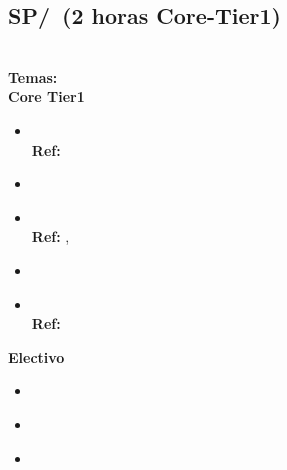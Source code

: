 \subsection{SP/\SPPrivacyandCivilLiberties~(2 horas Core-Tier1)}\label{sec:BOK:SPPrivacyandCivilLiberties}
\SPPrivacyandCivilLibertiesDescription\\
\noindent \textbf{Temas:}\\
\noindent \textbf{Core Tier1}
\begin{itemize}
	\item \SPPrivacyandCivilLibertiesTopicPhilosophicalFoundations\xspace \\ \textbf{Ref:} \label{sec:BOK:SPPrivacyandCivilLibertiesTopicPhilosophicalFoundations}
	\item \SPPrivacyandCivilLibertiesTopicLegalFoundations\label{sec:BOK:SPPrivacyandCivilLibertiesTopicLegalFoundations}
	\item \SPPrivacyandCivilLibertiesTopicPrivacy\xspace \\ \textbf{Ref:} , \label{sec:BOK:SPPrivacyandCivilLibertiesTopicPrivacy}
	\item \SPPrivacyandCivilLibertiesTopicRamifications\label{sec:BOK:SPPrivacyandCivilLibertiesTopicRamifications}
	\item \SPPrivacyandCivilLibertiesTopicTechnology\xspace \\ \textbf{Ref:} \label{sec:BOK:SPPrivacyandCivilLibertiesTopicTechnology}
\end{itemize}

\noindent \textbf{Electivo}
\begin{itemize}
	\item \SPPrivacyandCivilLibertiesTopicPrivacyLegislation\label{sec:BOK:SPPrivacyandCivilLibertiesTopicPrivacyLegislation}
	\item \SPPrivacyandCivilLibertiesTopicCivil\label{sec:BOK:SPPrivacyandCivilLibertiesTopicCivil}
	\item \SPPrivacyandCivilLibertiesTopicFreedom\label{sec:BOK:SPPrivacyandCivilLibertiesTopicFreedom}
\end{itemize}


